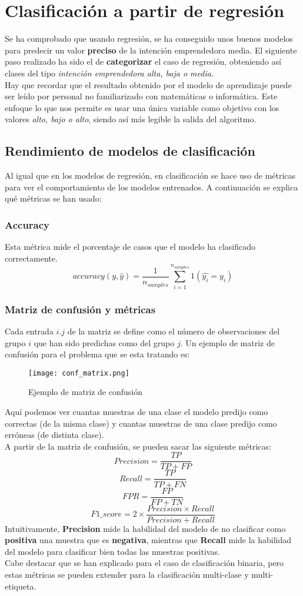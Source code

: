 \chapter{Clasificación a partir de regresión}
Se ha comprobado que usando regresión, se ha conseguido unos buenos modelos para predecir un valor \textbf{preciso} de la intención emprendedora media. El siguiente paso realizado ha sido el de \textbf{categorizar} el caso de regresión, obteniendo así clases del tipo \textit{intención emprendedora alta, baja o media}.\\
Hay que recordar que el resultado obtenido por el modelo de aprendizaje puede ser leído por personal no familiarizado con matemáticas o informática. Este enfoque lo que nos permite es usar una única variable como objetivo con los valores \textit{alto, bajo o alto}, siendo así más legible la salida del algoritmo.
\section{Rendimiento de modelos de clasificación}
Al igual que en los modelos de regresión, en clasificación se hace uso de métricas para ver el comportamiento de los modelos entrenados. A continuación se explica qué métricas se han usado:
\subsection{Accuracy}
Esta métrica mide el porcentaje de casos que el modelo ha clasificado correctamente.
\[
	accuracy(y,\hat{y})=\frac{1}{n_{samples}}\sum_{i=1}^{n_{samples}}1(\hat{y_i}=y_i)
\]

\subsection{Matriz de confusión y métricas}
Cada entrada $i.j$ de la matriz se define como el número de observaciones del grupo $i$ que han sido predichas como del grupo $j$.  Un ejemplo de matriz de confusión para el problema que se esta tratando es:
 \begin{figure}[H]
	\centering
	\texttt{[image: conf\_matrix.png]}
	\caption{Ejemplo de matriz de confusión}
	\label{fig:conf_matrix}
\end{figure}
Aquí podemos ver cuantas muestras de una clase  el modelo predijo como correctas (de la misma clase) y cuantas muestras de una clase predijo como  erróneas (de distinta clase).\\
\linebreak
A partir de la matriz de confusión, se pueden sacar las siguiente métricas:
 \[Precision = \frac{TP} {TP + FP}\]
 \[Recall = \frac{TP}{TP + FN}\]
 \[FPR = \frac{FP}{FP + TN}\]
 \[ F1\_score = 2 \times \frac{Precision \times Recall}{Precision + Recall} \]
  Intuitivamente, \textbf{Precision} mide la habilidad del modelo de no clasificar como \textbf{positiva} una muestra que es \textbf{negativa}, mientras que \textbf{Recall} mide la habilidad del modelo para clasificar bien todas las muestras positivas.\\
  \linebreak
 Cabe destacar que se han explicado para el caso de clasificación binaria, pero estas métricas se pueden extender para la clasificación multi-clase y multi-etiqueta.
